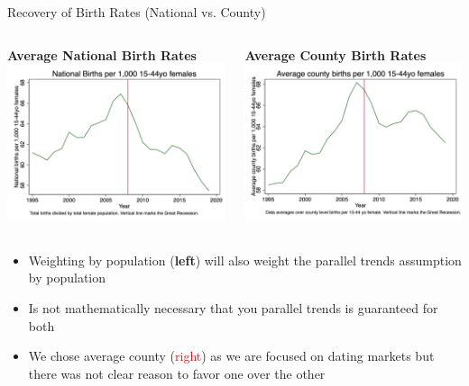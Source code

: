 \documentclass{beamer}
\begin{document}
\begin{frame}{Recovery of Birth Rates (National vs. County)}
    \centering
    \begin{columns}
        \centering
        \textbf{Average National Birth Rates}
        \includegraphics[width=\linewidth,height=0.6\textheight,keepaspectratio]{./lecture_includes/national_br.png}
        
        \centering
        \textbf{Average County Birth Rates}
        \includegraphics[width=\linewidth,height=0.6\textheight,keepaspectratio]{./lecture_includes/county_br.png}
    \end{columns}
    
    \begin{itemize}
    \item Weighting by population (\textbf{left}) will also weight the parallel trends assumption by population 
    \item Is not mathematically necessary that you parallel trends is guaranteed for both
    \item We chose average county (\textcolor{red}{right}) as we are focused on dating markets but there was not clear reason to favor one over the other
    \end{itemize}
    
\end{frame}
\end{document}
